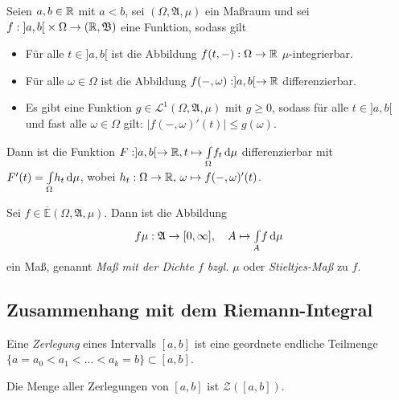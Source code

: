 \documentclass{cheat-sheet}
\newcommand{\Alg}{\mathfrak{A}} %
\newcommand{\Bor}{\mathfrak{B}} %
\newcommand{\E}{\mathbb{E}} %
\newcommand{\Leb}{\mathcal{L}} %
\newcommand{\IntOmu}[1]{\Int{\Omega}{}{#1}{\mu}} %
\begin{document}
\vspace{-20pt}

\begin{satz}
  Seien $a, b \in \mathbb{R}$ mit $a < b$, sei $(\Omega, \Alg, \mu)$ ein Maßraum und sei $f : \left]a, b\right[ \times \Omega \to (\R, \Bor)$ eine Funktion, sodass gilt
  \begin{itemize}
    \item Für alle $t \in ]a, b[$ ist die Abbildung $f(t, -) : \Omega \to \mathbb{R}$ $\mu$-integrierbar.
    \item Für alle $\omega \in \Omega$ ist die Abbildung $f(-, \omega) : ]a, b[ \to \mathbb{R}$ differenzierbar.
    \item Es gibt eine Funktion $g \in \Leb^1(\Omega, \Alg, \mu)$ mit $g \geq 0$, sodass für alle $t \in ]a, b[$ und fast alle $\omega \in \Omega$ gilt: $\left|f(-, \omega)'(t)\right| \leq g(\omega)$.
  \end{itemize}
  Dann ist die Funktion $F : ]a, b[ \to \R, t \mapsto \IntOmu{f_t}$ differenzierbar mit\\[-3pt]
  $F'(t) = \IntOmu{h_t}$, wobei $h_t : \Omega \to \mathbb{R}, \, \omega \mapsto f(-, \omega)'(t)$.
\end{satz}

\begin{samepage}

\begin{satz}
  Sei $f \in \overline{\E}(\Omega, \Alg, \mu)$. Dann ist die Abbildung
  \[ f \mu : \Alg \to [0, \infty], \quad A \mapsto \Int{A}{}{f}{\mu} \]
  ein Maß, genannt \emph{Maß mit der Dichte $f$ bzgl. $\mu$} oder \emph{Stieltjes-Maß} zu $f$.
\end{satz}

\subsection{Zusammenhang mit dem Riemann-Integral}

\end{samepage}

\begin{defn}
  Eine \emph{Zerlegung} eines Intervalls $[a, b]$ ist eine geordnete endliche Teilmenge $\{ a = a_0 < a_1 < ... < a_k = b\} \subset [a, b]$.
\end{defn}

\begin{nota}
  Die Menge aller Zerlegungen von $[a, b]$ ist $\mathcal{Z}([a, b])$.
\end{nota}
\end{document}

